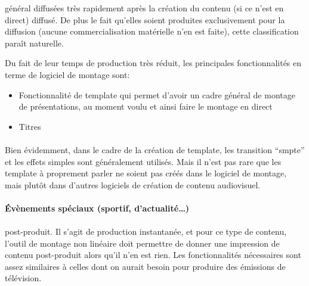 général diffusées très rapidement après la création du contenu
(si ce n'est en direct)%
diffusé. De plus le fait qu'elles soient produites exclusivement pour
la diffusion (aucune commercialisation matérielle n'en est faite),
cette classification paraît naturelle.

Du fait de leur temps de production très réduit, les principales
fonctionnalités en terme de logiciel de montage sont: \begin{itemize}
\setlength{\itemsep}{2mm}
  \item{Fonctionnalité de template qui permet d'avoir un cadre général
  de montage de
    présentations, au moment voulu et ainsi faire le montage en direct}
  \item{Titres}
\end{itemize}

\paragraph{}

Bien évidemment, dans le cadre de la création de template,
les transition ``smpte'' et les effets simples sont
généralement utilisés. Mais il n'est pas rare que les template à
proprement parler ne soient pas créés dans le logiciel de montage,
mais plutôt dans d'autres logiciels de création de contenu audiovisuel.

\paragraph {Évènements spéciaux (sportif, d'actualité\ldots)}

\paragraph{}

post-produit. Il s'agit de production instantanée, et pour ce type
de contenu, l'outil de montage non linéaire doit permettre de donner
une impression de contenu post-produit alors qu'il n'en est rien. Les
fonctionnalités nécessaires sont assez similaires à celles dont on
aurait besoin pour produire des émissions de télévision.

\subparagraph{}

